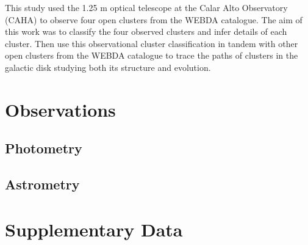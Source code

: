 This study used the 1.25 m optical telescope at the Calar Alto Observatory (CAHA) to observe four open clusters from the WEBDA catalogue. The aim of this work was to classify the four observed clusters and infer details of each cluster. Then use this observational cluster classification in tandem with other open clusters from the WEBDA catalogue to trace the paths of clusters in the galactic disk studying both its structure and evolution.

\section{Observations} 

\subsection{Photometry}

\subsection{Astrometry}

\section{Supplementary Data}